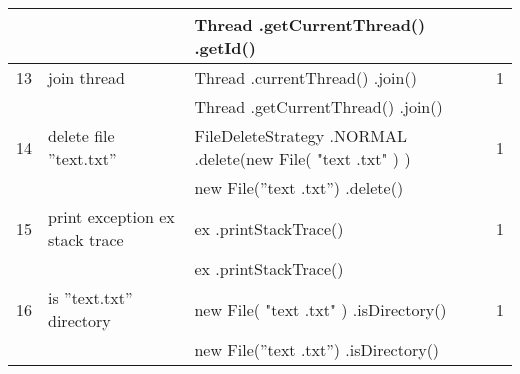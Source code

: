 \begin{longtable}{|p{}|p{}|p{}|p{}|}
		\rowcolor[HTML]{9AFF99} 
		&                                                        & Thread .getCurrentThread() .getId()                                                                              &                                         \\ \hline
		\rowcolor[HTML]{FFCCC9} 
		13                                & join thread                                            & Thread .currentThread() .join()                                                                                  & 1                                       \\ \hline
		\rowcolor[HTML]{9AFF99} 
		&                                                        & Thread .getCurrentThread() .join()                                                                               &                                         \\ \hline
		\rowcolor[HTML]{FFCCC9} 
		14                                & delete file ”text.txt”                                 & FileDeleteStrategy .NORMAL .delete(new File( "text .txt" ) )                                                     & 1                                       \\ \hline
		\rowcolor[HTML]{9AFF99} 
		&                                                        & new File(”text .txt”) .delete()                                                                                  &                                         \\ \hline
		\rowcolor[HTML]{FFCCC9} 
		15                                & print exception ex stack trace                         & ex  .printStackTrace()                                                                                           & 1                                       \\ \hline
		\rowcolor[HTML]{9AFF99} 
		&                                                        & ex .printStackTrace()                                                                                            &                                         \\ \hline
		\rowcolor[HTML]{FFCCC9} 
		16                                & is ”text.txt” directory                                & new File( "text .txt" ) .isDirectory()                                                                           & 1                                       \\ \hline
		\rowcolor[HTML]{9AFF99} 
		&                                                        & new File(”text .txt”) .isDirectory()                                                                             &                                         \\ \hline

\end{longtable}
